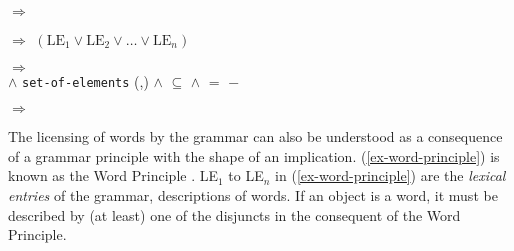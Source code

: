 \documentclass[output=paper,biblatex,babelshorthands,newtxmath,draftmode,colorlinks,citecolor=brown]{langscibook}
\begin{document}
{\begin{exe}
  \ex\label{ex-more-avms}
  \begin{xlist}
    \ex\label{ex-hfp}
    $\Rightarrow$
    
    \ex\label{ex-word-principle}
     $\Rightarrow$ $\left(\mbox{LE$_1$} \vee \mbox{LE$_2$} \vee \ldots  \vee \mbox{LE$_n$} \right)$
    
\ex\label{ex-semantics}
 $\Rightarrow$  \\
\hspace*{1.1cm}	$\wedge$ \texttt{set-of-elements} (,)
			$\wedge$  $\subseteq$ 
$\wedge$  $=$  $-$ 

\ex\label{ex-complex-ante}
$\Rightarrow$

  \end{xlist}
\end{exe}

The licensing of words by the grammar can also be
understood as a consequence of a grammar principle with the
shape of an implication. (\ref{ex-word-principle}) is known as the
Word Principle \citep*[500]{HoehleSpurenloseExtraktion}. LE$_{1}$ to LE$_{n}$
in (\ref{ex-word-principle}) are the
\emph{lexical entries} of the grammar, descriptions of words.  If an
object is a word, it must be described by (at least) one of the
disjuncts in the consequent of the Word Principle.

}
\end{document}
